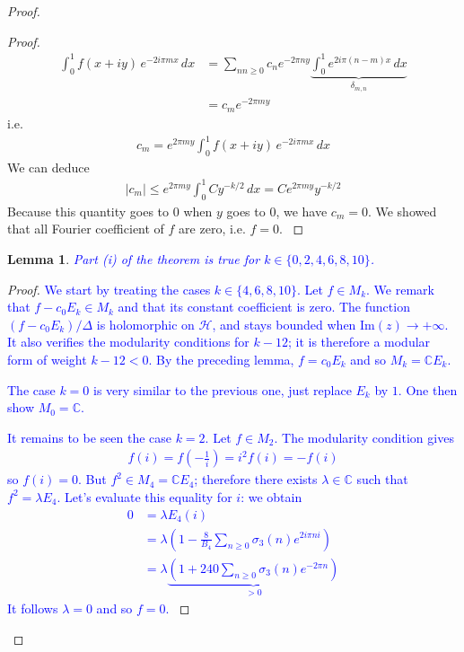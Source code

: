 \documentclass[12pt,a4paper,english]{article}
\theoremstyle{plain}
\newtheorem{lem}[thm]{Lemma}
\theoremstyle{definition}
\begin{document}
\begin{proof}
\begin{proof}
{\begin{align*}
\int_0^1 f(x+iy)\,e^{-2i\pi mx}\,dx&=\sum_{nn\geqslant 0}c_n e^{-2\pi ny}\underbrace{\int_0^1  e^{2i\pi (n-m)x}\,dx}_{\delta_{m,n}}\\
&=c_m e^{-2\pi my}
\end{align*}
i.e.
\begin{align*}
c_m=e^{2\pi my}\int_0^1 f(x+iy)\,e^{-2i\pi mx}\,dx
\end{align*}
We can deduce
\begin{align}\label{esticm}
|c_m|\leqslant e^{2\pi my}\int_0^1 Cy^{-k/2}\,dx=C e^{2\pi my}y^{-k/2}
\end{align}
Because this quantity goes to $0$ when $y$ goes to $0$, we have $c_m=0$. We showed that all Fourier coefficient of $f$ are zero, i.e. $f=0$.
}
\end{proof}
\vspace{0.5cm}


\begin{lem}
\textcolor{blue}{
Part \textit{(i)} of the theorem is true for $k\in\{0,2,4,6,8,10\}$.
}
\end{lem}

\begin{proof}
\textcolor{blue}{
We start by treating the cases $k\in\{4,6,8,10\}$. Let $f\in M_k$. We remark that $f-c_0 E_k\in M_k$ and that its constant coefficient is zero. The function $(f-c_0 E_k)/\Delta$ is holomorphic on $\mathcal{H}$, and stays bounded when $\text{Im}(z)\to +\infty$. It also verifies the modularity conditions for $k-12$; it is therefore a modular form of weight $k-12<0$. By the preceding lemma, $f=c_0 E_k$ and so $M_k=\mathbb{C}E_k$.
}

\textcolor{blue}{
The case $k=0$ is very similar to the previous one, just replace $E_k$ by $1$. One then show $M_0=\mathbb{C}$.
}

\textcolor{blue}{
It remains to be seen the case $k=2$. Let $f\in M_2$. The modularity condition gives
\begin{align*}
f(i)=f\left(-\frac{1}{i}\right)=i^2 f(i)=-f(i)
\end{align*}
so $f(i)=0$. But $f^2\in M_4=\mathbb{C}E_4$; therefore there exists $\lambda\in\mathbb{C}$ such that $f^2=\lambda E_4$. Let's evaluate this equality for $i$: we obtain
\begin{align*}
0&=\lambda E_4(i)\\
&=\lambda\left(1-\frac{8}{B_4}\sum_{n\geqslant 0}\sigma_3(n)e^{2i\pi ni}\right)\\
&=\lambda\underbrace{\left(1+240\sum_{n\geqslant 0}\sigma_3(n)e^{-2\pi n}\right)}_{>0}
\end{align*}
It follows $\lambda=0$ and so $f=0$.
}
\end{proof}
\vspace{0.5cm}


\end{proof}
\end{document}
